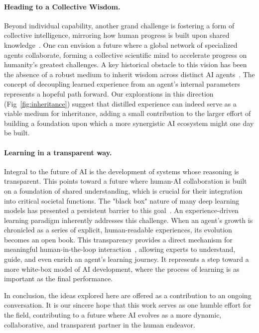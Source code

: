 \paragraph{Heading to a Collective Wisdom.}
Beyond individual capability, another grand challenge is fostering a form of collective intelligence, mirroring how human progress is built upon shared knowledge~\cite{10.1145/3368986}. One can envision a future where a global network of specialized agents collaborate, forming a collective scientific mind to accelerate progress on humanity's greatest challenges. A key historical obstacle to this vision has been the absence of a robust medium to inherit wisdom across distinct AI agents~\cite{CAMPBELL200257,silver2017masteringchessshogiselfplay}. The concept of decoupling learned experience from an agent's internal parameters represents a hopeful path forward. Our explorations in this direction (Fig~\ref{fig:inheritance}) suggest that distilled experience can indeed serve as a viable medium for inheritance, adding a small contribution to the larger effort of building a foundation upon which a more synergistic AI ecosystem might one day be built.

\paragraph{Learning in a transparent way.}
Integral to the future of AI is the development of systems whose reasoning is transparent. This points toward a future where human-AI collaboration is built on a foundation of shared understanding, which is crucial for their integration into critical societal functions. The "black box" nature of many deep learning models has presented a persistent barrier to this goal~\cite{https://doi.org/10.1002/ail2.61,gohel2021explainableaicurrentstatus,hsieh2024comprehensiveguideexplainableai}. An experience-driven learning paradigm inherently addresses this challenge. When an agent's growth is chronicled as a series of explicit, human-readable experiences, its evolution becomes an open book. This transparency provides a direct mechanism for meaningful human-in-the-loop interaction~\cite{Wu_2022}, allowing experts to understand, guide, and even enrich an agent's learning journey. It represents a step toward a more white-box model of AI development, where the process of learning is as important as the final performance.

In conclusion, the ideas explored here are offered as a contribution to an ongoing conversation. It is our sincere hope that this work serves as one humble effort for the field, contributing to a future where AI evolves as a more dynamic, collaborative, and transparent partner in the human endeavor.